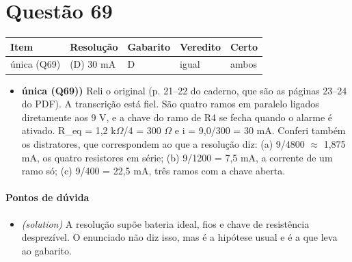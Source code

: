 \documentclass{article}%
\begin{document}
\section*{Questão 69}%
\begin{longtable}{@{}p{} p{} p{} p{} p{}@{}}\toprule Item & Resolução & Gabarito & Veredito & Certo \\ \midrule
única (Q69) & (D) 30 mA & D & igual & ambos \\
\bottomrule\end{longtable}%
\begin{itemize}%
\item%
\textbf{única (Q69))} Reli o original (p. 21--22 do caderno, que são as páginas 23--24 do PDF). A transcrição está fiel. São quatro ramos em paralelo ligados diretamente aos 9 V, e a chave do ramo de R4 se fecha quando o alarme é ativado. R\_eq = 1,2 k$\Omega$/4 = 300 $\Omega$ e i = 9,0/300 = 30 mA. Conferi também os distratores, que correspondem ao que a resolução diz: (a) 9/4800 $\approx$ 1,875 mA, os quatro resistores em série; (b) 9/1200 = 7,5 mA, a corrente de um ramo só; (c) 9/400 = 22,5 mA, três ramos com a chave aberta.%
\end{itemize}%
\paragraph{Pontos de dúvida}%
\begin{itemize}%
\item%
\textit{(solution)} A resolução supõe bateria ideal, fios e chave de resistência desprezível. O enunciado não diz isso, mas é a hipótese usual e é a que leva ao gabarito.%
\end{itemize}%
\end{document}
